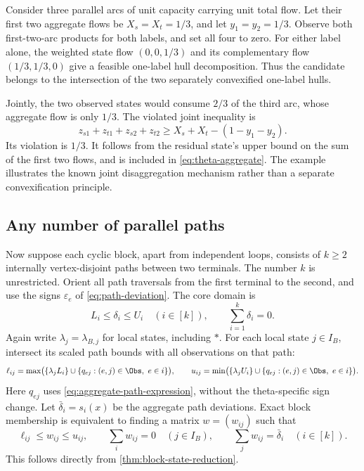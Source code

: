\begin{example}\label{ex:joint-theta}
Consider three parallel arcs of unit capacity carrying unit total flow.
Let their first two aggregate flows be $X_s=X_t=1/3$, and let
$y_1=y_2=1/3$. Observe both first-two-arc products for both labels, and
set all four to zero. For either label alone, the weighted state flow
$(0,0,1/3)$ and its complementary flow $(1/3,1/3,0)$ give a feasible
one-label hull decomposition. Thus the candidate belongs to the
intersection of the two separately convexified one-label hulls.

Jointly, the two observed states would consume $2/3$ of the third arc,
whose aggregate flow is only $1/3$. The violated joint inequality is
\begin{equation}\label{eq:joint-theta-cut}
 z_{s1}+z_{t1}+z_{s2}+z_{t2}
       \ge X_s+X_t-(1-y_1-y_2).
\end{equation}
Its violation is $1/3$. It follows from the residual state's upper
bound on the sum of the first two flows, and is included in
\eqref{eq:theta-aggregate}. The example illustrates the known joint
disaggregation mechanism rather than a separate convexification principle.
\end{example}

\subsection{Any number of parallel paths}\label{subsec:parallel-paths}
Now suppose each cyclic block, apart from independent loops, consists of
$k\ge2$ internally vertex-disjoint paths between two terminals. The
number $k$ is unrestricted. Orient all path traversals from the first
terminal to the second, and use the signs $\varepsilon_e$ of
\eqref{eq:path-deviation}. The core domain is
\begin{equation}\label{eq:parallel-base}
 L_i\le\delta_i\le U_i\quad(i\in[k]),\qquad
                 \sum_{i=1}^k\delta_i=0.
\end{equation}
Again write $\lambda_j=\lambda_{B,j}$ for local states, including $*$.
For each local state $j\in I_B$, intersect its scaled path bounds with
all observations on that path:
\begin{equation}\label{eq:parallel-endpoints}
 \ell_{ij}=\max\bigl(\{\lambda_jL_i\}\cup
           \{q_{ej}:(e,j)\in\Obs,\ e\in i\}\bigr),\qquad
 u_{ij}=\min\bigl(\{\lambda_jU_i\}\cup
           \{q_{ej}:(e,j)\in\Obs,\ e\in i\}\bigr).
\end{equation}
Here $q_{ej}$ uses \eqref{eq:aggregate-path-expression}, without the
theta-specific sign change. Let $\bar\delta_i=s_i(x)$ be the aggregate
path deviations. Exact block membership is equivalent to finding a
matrix $w=(w_{ij})$ such that
\begin{equation}\label{eq:parallel-matrix}
 \ell_{ij}\le w_{ij}\le u_{ij},\qquad
 \sum_iw_{ij}=0\quad(j\in I_B),\qquad
 \sum_jw_{ij}=\bar\delta_i\quad(i\in[k]).
\end{equation}
This follows directly from \cref{thm:block-state-reduction}.

